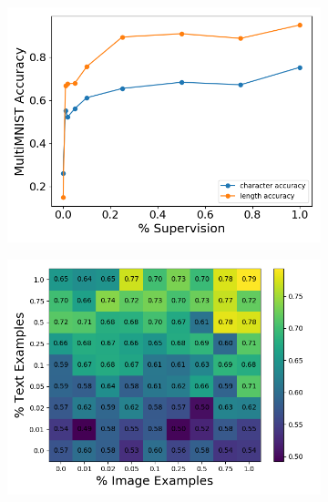 \documentclass{article}
\begin{document}
\begin{figure}[!h]
\centering
    \begin{subfigure}[b]{.32\linewidth}
        \centering
        \includegraphics[width=\linewidth]{multimnist_mmvae_joint_weak_supervision.png}
        \caption{}
    \end{subfigure}
    \begin{subfigure}[b]{.32\linewidth}
        \centering
        \includegraphics[width=\linewidth]{multimnist_mmvae_modal_char_weak_supervision.png}
        \caption{}
    \end{subfigure}
    \begin{subfigure}[b]{.32\linewidth}
        \centering

\end{subfigure}
\end{figure}
\end{document}
